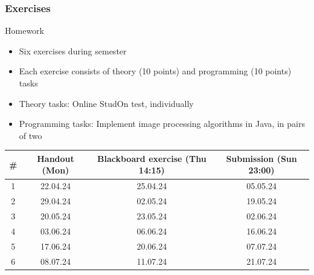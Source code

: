 \begin{frame}
	\frametitle{Exercises}
	\begin{block}{Homework}
		\begin{itemize}
			\item Six exercises during semester
			\item Each exercise consists of theory (10 points) and programming (10 points) tasks
			\item Theory tasks: Online StudOn test, individually
			\item Programming tasks: Implement image processing algorithms in Java, in pairs of two
		\end{itemize}
		\begin{center}
			\begin{tabular}{c | c | c | c}
				\# & Handout (Mon) 	& Blackboard exercise (Thu 14:15)	& Submission (Sun 23:00) \\ \hline
				1  & 22.04.24    	& 25.04.24               				& 05.05.24       \\
				2  & 29.04.24    	& 02.05.24                				& 19.05.24       \\
				3  & 20.05.24    	& 23.05.24                				& 02.06.24       \\
				4  & 03.06.24    	& 06.06.24                				& 16.06.24       \\
				5  & 17.06.24    	& 20.06.24                				& 07.07.24       \\
				6  & 08.07.24    	& 11.07.24                				& 21.07.24       \\
			\end{tabular}
		\end{center}
	\end{block}
\end{frame}

